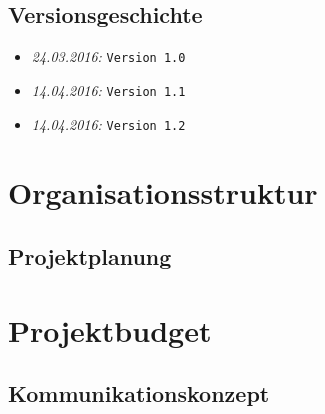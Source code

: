 \documentclass{fhnwreport/fhnwreport}
\begin{document}


\tableofcontents
\vspace{120mm}
\subsection*{Versionsgeschichte}
\begin{itemize}
    \item[]
        \emph{24.03.2016:} \texttt{Version 1.0}
    \item[]
        \emph{14.04.2016:} \texttt{Version 1.1}
    \item[]
        \emph{14.04.2016:} \texttt{Version 1.2}
\end{itemize}
\clearpage

\section{Organisationsstruktur}
\label{sec:organisatsionsstruktur}


\clearpage
\begin{landscape}
\section{Projektplanung}
\label{sec:projektplanung}

\end{landscape}

\clearpage
\section{Projektbudget}
\label{sec:Projektbudget}


\clearpage
\begin{landscape}
\section{Kommunikationskonzept}
\label{sec:kommunikationskonzept}

\end{landscape}
\end{document}
